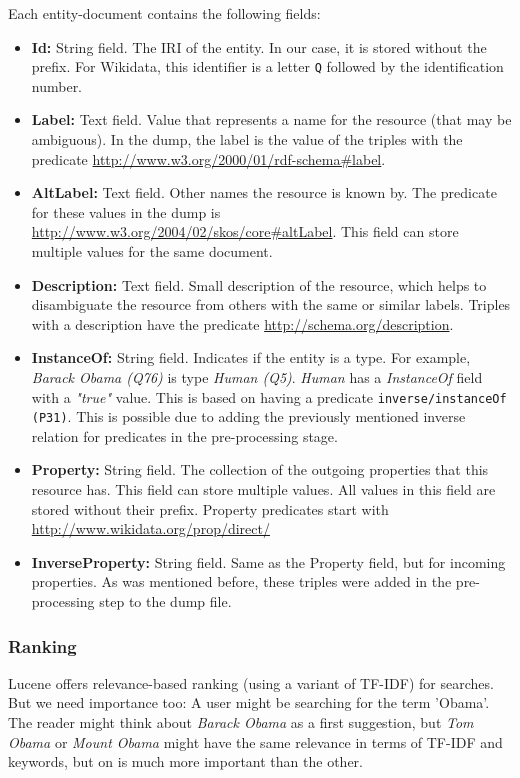 Each entity-document contains the following fields:
\begin{itemize}
    \item \textbf{Id:} String field. The IRI of the entity. In our case, it is stored without the prefix. For Wikidata, this identifier is a letter \texttt{Q} followed by the identification number.
    \item \textbf{Label:} Text field.  Value that represents a name for the resource (that may be ambiguous).  In the dump, the label is the value of the triples with the predicate \url{http://www.w3.org/2000/01/rdf-schema#label}. 
    \item \textbf{AltLabel:} Text field. Other names the resource is known by.  The predicate for these values in the dump is \url{http://www.w3.org/2004/02/skos/core#altLabel}. This field can store multiple values for the same document.
    \item \textbf{Description:} Text field. Small description of the resource, which helps to disambiguate the resource from others with the same or similar labels. Triples with a description have the predicate \url{http://schema.org/description}.
    \item \textbf{InstanceOf:} String field. Indicates if the entity is a type. For example, \textit{Barack Obama (Q76)} is type \textit{Human (Q5)}. \textit{Human} has a \textit{InstanceOf} field with a \textit{"true"} value. This is based on having a predicate \texttt{inverse/instanceOf (P31)}. This is possible due to adding the previously mentioned inverse relation for predicates in the pre-processing stage.
    \item \textbf{Property:} String field. The collection of the outgoing properties that this resource has. This field can store multiple values. All values in this field are stored without their prefix. Property predicates start with  \url{http://www.wikidata.org/prop/direct/}
    \item \textbf{InverseProperty:} String field. Same as the Property field, but for incoming properties. As was mentioned before, these triples were added in the pre-processing step to the dump file.
\end{itemize}

\subsubsection{Ranking}

Lucene offers relevance-based ranking (using a variant of TF-IDF) for searches. But we need importance too: A user might be searching for the term 'Obama'. The reader might think about \textit{Barack Obama} as a first suggestion, but \textit{Tom Obama} or \textit{Mount Obama} might have the same relevance in terms of TF-IDF and keywords, but on is much more important than the other.

